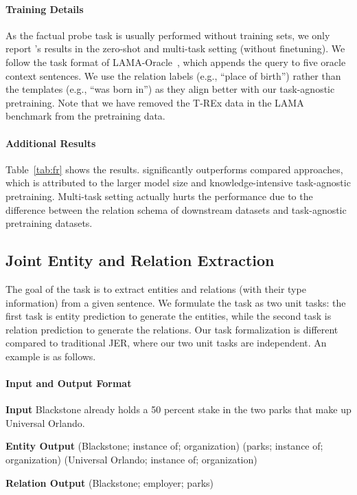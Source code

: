 \paragraph{Training Details} 
As the factual probe task is usually performed without training sets, we only report \method's results in the zero-shot and multi-task setting (without finetuning). We follow the task format of LAMA-Oracle~\cite{petroni2020context}, which appends the query to five oracle context sentences. We use the relation labels (e.g., ``place of birth'') rather than the templates (e.g., ``was born in'') as they align better with our task-agnostic pretraining. Note that we have removed the T-REx data in the LAMA benchmark from the pretraining data.

\paragraph{Additional Results}
Table~\ref{tab:fr} shows the results. \method significantly outperforms compared approaches, which is attributed to the larger model size and knowledge-intensive task-agnostic pretraining. Multi-task setting actually hurts the performance due to the difference between the relation schema of downstream datasets and task-agnostic pretraining datasets. 

\subsection{Joint Entity and Relation Extraction}
\label{appendix:jer}
The goal of the task is to extract entities and relations (with their type information) from a given sentence. We formulate the task as two unit tasks: the first task is entity prediction to generate the entities, while the second task is relation prediction to generate the relations. Our task formalization is different compared to traditional JER, where our two unit tasks are independent. An example is as follows.
\paragraph{Input and Output Format}
\begin{enumerate*}
    \item[] {\bf Input} Blackstone already holds a 50 percent stake in the two parks that make up Universal Orlando.
    \item[] {\bf Entity Output} (Blackstone; instance of; organization) (parks; instance of; organization) (Universal Orlando; instance of; organization)
    \item[] {\bf Relation Output} (Blackstone; employer; parks)
\end{enumerate*}

